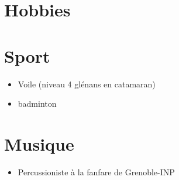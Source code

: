 \documentclass[verylight]{hipstercv} %
\newlength{\rightcolwidth}
\begin{document}
\begin{paracol}{2}
\begin{tabular}{r| p{} c}
\end{tabular}

\vspace{4em}
\section*{Hobbies}
\begin{minipage}[t]{0.3\textwidth}
\section*{Sport}
\begin{itemize}
    \item Voile (niveau 4 glénans en catamaran)
    \item badminton
\end{itemize}
\end{minipage}
\begin{minipage}[t]{0.3\textwidth}
\section*{Musique}
\begin{itemize}
\item Percussioniste à la fanfare de Grenoble-INP
\end{itemize}
\end{minipage}





\end{paracol}
\end{document}
